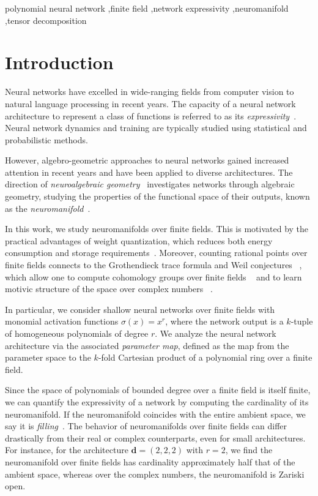 \documentclass[a4paper]{cas-sc}
\newcommand{\dd}{\mathbf{d}}    %
\begin{document}
\begin{keywords}
polynomial neural network \sep finite field \sep network expressivity \sep neuromanifold \sep tensor decomposition
\end{keywords}

\maketitle

\section{Introduction}
Neural networks have excelled in wide-ranging fields from computer vision to natural language processing in recent years. The capacity of a neural network architecture to represent a class of functions is referred to as its \textit{expressivity}~\citep{GUHRING20}. Neural network dynamics and training are typically studied using statistical and probabilistic methods.
    
    However, algebro-geometric approaches to neural networks gained increased attention in recent years and have been applied to diverse architectures. The direction of \textit{neuroalgebraic geometry}~\citep{MARCHETTI2025} investigates networks through algebraic geometry, studying the properties of the functional space of their outputs, known as the \textit{neuromanifold}~\citep{TRAGER20}. 
    
    In this work, we study neuromanifolds over finite fields. This is motivated by the practical advantages of weight quantization, which reduces both energy consumption and storage requirements~\citep{YUAN23}. Moreover, counting rational points over finite fields connects to the Grothendieck trace formula and Weil conjectures ~\citep{DELIGNE1980}, which allow one to compute cohomology groups over finite fields ~\citep{BRYAN26} and to learn motivic structure of the space over complex numbers ~\citep{BAEZ25}.

    In particular, we consider shallow neural networks over finite fields with monomial activation functions $\sigma(x) = x^r$, where the network output is a $k$-tuple of homogeneous polynomials of degree $r$. We analyze the neural network architecture via the associated \textit{parameter map}, defined as the map from the parameter space to the $k$-fold Cartesian product of a polynomial ring over a finite field.
    
    Since the space of polynomials of bounded degree over a finite field is itself finite, we can quantify the expressivity of a network by computing the cardinality of its neuromanifold. If the neuromanifold coincides with the entire ambient space, we say it is \textit{filling}~\citep{KILEEL19}. The behavior of neuromanifolds over finite fields can differ drastically from their real or complex counterparts, even for small architectures. For instance, for the architecture $\dd = (2,2,2)$ with $r=2$, we find the neuromanifold over finite fields has cardinality approximately half that of the ambient space, whereas over the complex numbers, the neuromanifold is Zariski open.
\end{document}
